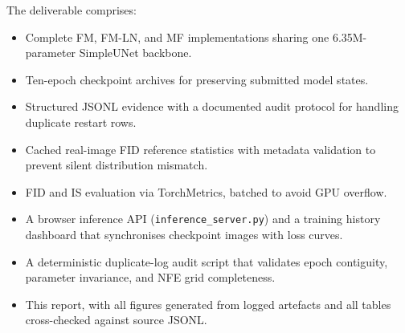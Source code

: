 The deliverable comprises:

\begin{itemize}
  \item Complete FM, FM-LN, and MF implementations sharing one 6.35M-parameter
        SimpleUNet backbone.
  \item Ten-epoch checkpoint archives for preserving submitted model states.
  \item Structured JSONL evidence with a documented audit protocol for handling
        duplicate restart rows.
  \item Cached real-image FID reference statistics with metadata validation to
        prevent silent distribution mismatch.
  \item FID and IS evaluation via TorchMetrics, batched to avoid GPU overflow.
  \item A browser inference API (\texttt{inference\_server.py}) and a training
        history dashboard that synchronises checkpoint images with loss curves.
  \item A deterministic duplicate-log audit script that validates epoch
        contiguity, parameter invariance, and NFE grid completeness.
  \item This report, with all figures generated from logged artefacts and all
        tables cross-checked against source JSONL.
\end{itemize}
